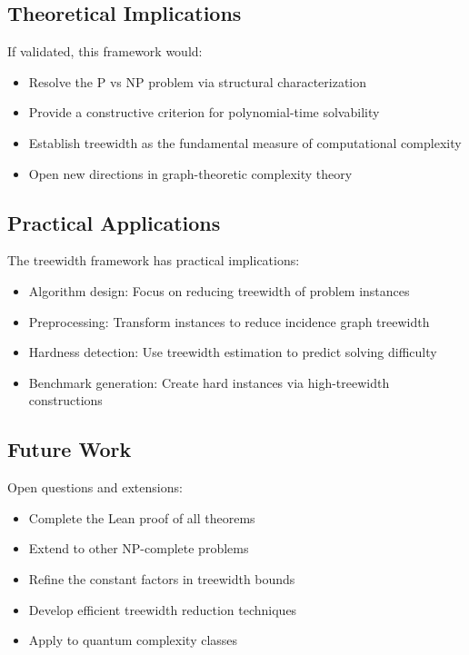 \documentclass[11pt]{article}
\begin{document}
\subsection{Theoretical Implications}

If validated, this framework would:
\begin{itemize}
\item Resolve the P vs NP problem via structural characterization
\item Provide a constructive criterion for polynomial-time solvability
\item Establish treewidth as the fundamental measure of computational complexity
\item Open new directions in graph-theoretic complexity theory
\end{itemize}

\subsection{Practical Applications}

The treewidth framework has practical implications:
\begin{itemize}
\item Algorithm design: Focus on reducing treewidth of problem instances
\item Preprocessing: Transform instances to reduce incidence graph treewidth
\item Hardness detection: Use treewidth estimation to predict solving difficulty
\item Benchmark generation: Create hard instances via high-treewidth constructions
\end{itemize}

\subsection{Future Work}

Open questions and extensions:
\begin{itemize}
\item Complete the Lean proof of all theorems
\item Extend to other NP-complete problems
\item Refine the constant factors in treewidth bounds
\item Develop efficient treewidth reduction techniques
\item Apply to quantum complexity classes
\end{itemize}
\end{document}

